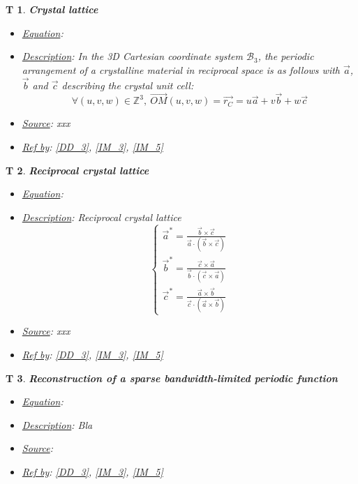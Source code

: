 \documentclass[12pt]{article}
\newtheorem{T}{T}
\begin{document}
\begin{T}
\label{T_2}
\noindent\colorbox{shadecolorT}{\normalfont \textbf{Crystal lattice}}
\normalfont
\begin{itemize}
\item \underline{Equation}: 
\item \underline{Description}: In the 3D Cartesian coordinate system $\mathcal{B}_3$, the periodic arrangement of a crystalline material in reciprocal space is as follows with $\vec{a}$, $\vec{b}$ and $\vec{c}$ describing the crystal unit cell:
\begin{equation}
\forall (u,v,w) \in \mathbb{Z}^{3}, \ \overrightarrow{OM}(u,v,w) = \vec{r_C} = u \vec{a} + v \vec{b} + w \vec{c} 
\end{equation}
\item \underline{Source}: xxx
\item \underline{Ref by}: \cref{DD_3}, \cref{IM_3}, \cref{IM_5}
\end{itemize}
\end{T}

\begin{T}
\label{T_3}
\noindent\colorbox{shadecolorT}{\normalfont \textbf{Reciprocal crystal lattice}}
\normalfont
\begin{itemize}
\item \underline{Equation}: 
\item \underline{Description}: Reciprocal crystal lattice
\begin{equation}
\begin{cases}
\vec{a}^{*} = \frac{\vec{b}\times \vec{c}}{\vec{a}\cdot(\vec{b}\times \vec{c})} \\
\vec{b}^{*} = \frac{\vec{c}\times \vec{a}}{\vec{b}\cdot(\vec{c}\times \vec{a})} \\
\vec{c}^{*} = \frac{\vec{a}\times \vec{b}}{\vec{c}\cdot(\vec{a}\times \vec{b})}
\end{cases}
\end{equation}
\item \underline{Source}: xxx
\item \underline{Ref by}: \cref{DD_3}, \cref{IM_3}, \cref{IM_5}
\end{itemize}
\end{T}

\begin{T}
\label{T_4}
\noindent\colorbox{shadecolorT}{\normalfont \textbf{Reconstruction of a sparse bandwidth-limited periodic function}}
\normalfont
\begin{itemize}
\item \underline{Equation}: 
\item \underline{Description}: Bla
\item \underline{Source}: \cite{Hytch1998,Rouviere2005}
\item \underline{Ref by}: \cref{DD_3}, \cref{IM_3}, \cref{IM_5}
\end{itemize}
\end{T}
\end{document}
